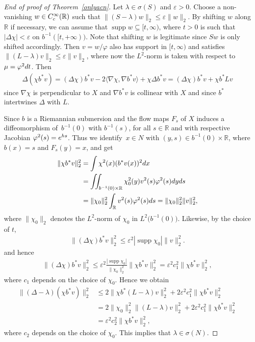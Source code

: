 \documentclass[11pt]{article}
\numberwithin{equation}{section}
\numberwithin{equation}{section}
\DeclareMathOperator{\supp}{supp}
\def\R{\mathbb R}
\def\ve{\varepsilon}
\def\vf{\varphi}
\begin{document}
\begin{proof}[End of proof of Theorem~\ref{onlyacn}]
Let $\lambda\in\sigma(S)$ and $\ve>0$.
Choose a non-vanishing $w\in C^\infty_{\rm c}(\R)$ such that $\|(S-\lambda)w\|_2\le\ve\|w\|_2$.
By shifting $w$ along $\R$ if necessary, we can assume that $\supp w\subseteq[t,\infty)$,
where $t>0$ is such that $|\Delta\chi| < \ve$ on $b^{-1}([t,+\infty))$.
Note that shifting $w$ is legitimate since $Sw$ is only shifted accordingly.
Then $v=w/\vf$ also has support in $[t,\infty)$ and satisfies $\|(L-\lambda)v\|_2\le\ve\|v\|_2$,
where now the $L^2$-norm is taken with respect to $\mu=\vf^2{\rm d}t$.
Then
\begin{align*}
	\Delta(\chi b^*v)
	= (\Delta\chi)b^*v - 2\langle\nabla\chi,\nabla b^*v\rangle + \chi\Delta b^*v
	= (\Delta\chi)b^*v + \chi b^*Lv
\end{align*}
since $\nabla\chi$ is perpendicular to $X$ and $\nabla b^*v$ is collinear with $X$
and since $b^*$ intertwines $\Delta$ with $L$.

Since $b$ is a Riemannian submersion and the flow maps $F_s$ of $X$ induces
a diffeomorphism of~$b^{-1}(0)$ with $b^{-1}(s)$,
for all $s\in\R$ and with respective Jacobian $\vf^2(s)={\rm e}^{hs}$.
Thus we identify~$x\in N$ with $(y,s)\in b^{-1}(0)\times\R$, where $b(x)=s$ and $F_s(y)=x$,
and get
\begin{align*}%
	\|\chi b^*v\|_2^2
	&= \int \chi^2(x)(b^*v(x))^2{\rm d}x \\
	&= \iint_{b^{-1}(0)\times\R}\chi_0^2(y)v^2(s)\vf^2(s){\rm d}y{\rm d}s \\
	&= \|\chi_0\|_2^2 \int_\R v^2(s)\vf^2(s){\rm d}s
	= \|\chi_0\|_2^2 \|v\|_2^2,
\end{align*}
where $\|\chi_0\|_2$ denotes the $L^2$-norm of $\chi_0$ in $L^2\bigl(b^{-1}(0)\bigr)$.
Likewise, by the choice of $t$,
\begin{align*}%
	\|(\Delta\chi)b^*v\|_2^2
	\le \ve^2|\supp\chi_0| \|v\|_2^2.
\end{align*}
and hence
\begin{align*}%
	\|(\Delta\chi)b^*v\|_2^2
	\le \ve^2\frac{|\supp\chi_0|}{ \|\chi_0\|_2^2}\|\chi b^*v\|_2^2
	= \ve^2c_1^2\|\chi b^*v\|_2^2,
\end{align*}
where $c_1$ depends on the choice of $\chi_0$.
Hence we obtain
\begin{align*}%
	\|(\Delta-\lambda)(\chi b^*v)\|_2^2
	&\le 2\|\chi b^*(L-\lambda)v\|_2^2 + 2\ve^2c_1^2\|\chi b^*v\|_2^2 \\
	&= 2\|\chi_0\|_2^2 \|(L-\lambda)v\|_2^2 + 2\ve^2c_1^2\|\chi b^*v\|_2^2 \\
	&= \ve^2c_2^2\|\chi b^*v\|_2^2,
\end{align*}
where $c_2$ depends on the choice of $\chi_0$.
This implies that $\lambda\in\sigma(N)$.
\end{proof}
\end{document}
